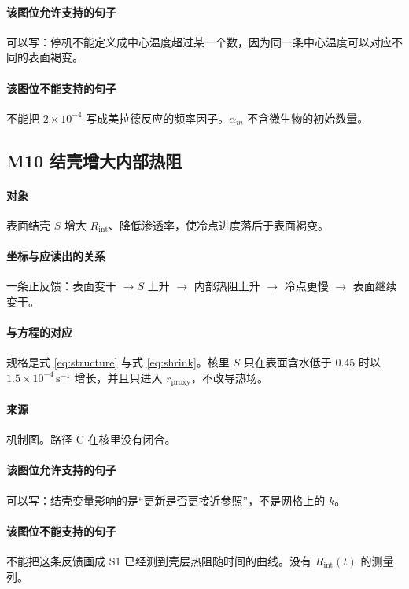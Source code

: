 \paragraph{该图位允许支持的句子}
可以写：停机不能定义成中心温度超过某一个数，因为同一条中心温度可以对应不同的表面褐变。

\paragraph{该图位不能支持的句子}
不能把 $2\times 10^{-4}$ 写成美拉德反应的频率因子。$\alpha_m$ 不含微生物的初始数量。

\subsection{M10 结壳增大内部热阻}
\paragraph{对象}
表面结壳 $S$ 增大 $R_{\mathrm{int}}$、降低渗透率，使冷点进度落后于表面褐变。

\paragraph{坐标与应读出的关系}
一条正反馈：表面变干 $\to S$ 上升 $\to$ 内部热阻上升 $\to$ 冷点更慢 $\to$ 表面继续变干。

\paragraph{与方程的对应}
规格是式 \eqref{eq:structure} 与式 \eqref{eq:shrink}。核里 $S$ 只在表面含水低于 $0.45$ 时以 $1.5\times 10^{-4}\,\mathrm{s}^{-1}$ 增长，并且只进入 $r_{\mathrm{proxy}}$，不改导热场。

\paragraph{来源}
机制图。路径 C 在核里没有闭合。

\paragraph{该图位允许支持的句子}
可以写：结壳变量影响的是“更新是否更接近参照”，不是网格上的 $k$。

\paragraph{该图位不能支持的句子}
不能把这条反馈画成 S1 已经测到壳层热阻随时间的曲线。没有 $R_{\mathrm{int}}(t)$ 的测量列。


